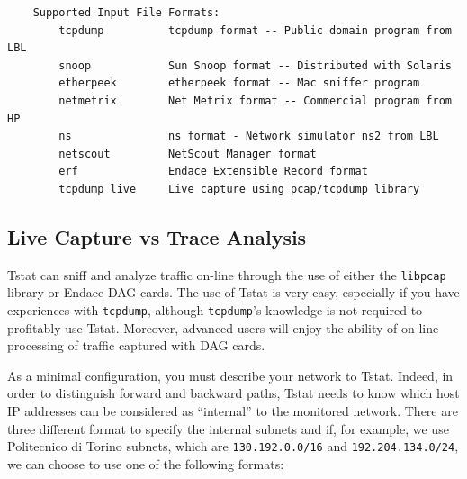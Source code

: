 \documentclass[11pt]{article}
\begin{document}
\begin{small}\begin{verbatim}
    Supported Input File Formats:
        tcpdump          tcpdump format -- Public domain program from LBL
        snoop            Sun Snoop format -- Distributed with Solaris
        etherpeek        etherpeek format -- Mac sniffer program
        netmetrix        Net Metrix format -- Commercial program from HP
        ns               ns format - Network simulator ns2 from LBL
        netscout         NetScout Manager format
        erf              Endace Extensible Record format
        tcpdump live     Live capture using pcap/tcpdump library
\end{verbatim}\end{small} \noindent
\subsection{Live Capture vs Trace Analysis\label{Live_Capture_vs_Trace_Analysis}}


Tstat can sniff and analyze traffic on-line through the
use of either the \texttt{libpcap} library or Endace DAG cards. 
The use of Tstat is very easy, especially if you have
experiences with \texttt{tcpdump}, although \texttt{tcpdump}'s knowledge
is not required to profitably use Tstat. Moreover, advanced 
users will enjoy the ability of on-line processing of traffic
captured with DAG cards.



As a minimal configuration, you must describe your network to Tstat. Indeed, in
order to distinguish forward and backward paths, Tstat needs to know which host
IP addresses can be considered as ``internal'' to the monitored network. 
There are three different format to specify the internal subnets and
if, for example, we use Politecnico di Torino subnets, which are \texttt{130.192.0.0/16} and
\texttt{192.204.134.0/24}, we can choose to use one of the following formats:
\end{document}
